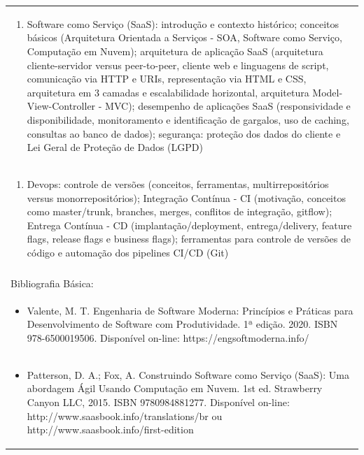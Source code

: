 \documentclass[11pt]{article}
\begin{document}
\begin{center}
\begin{longtable}{|p{4cm}|p{4cm}|p{4cm}|p{4cm}|}
\multicolumn{4}{|p{\dimexpr 16cm + 6\tabcolsep\relax}|}{\begin{enumerate}[start=4]\item Software como Serviço (SaaS): introdução e contexto histórico; conceitos básicos (Arquitetura Orientada a Serviços - SOA, Software como Serviço, Computação em Nuvem); arquitetura de aplicação SaaS (arquitetura cliente-servidor versus peer-to-peer, cliente web e linguagens de script, comunicação via HTTP e URIs, representação via HTML e CSS, arquitetura em 3 camadas e escalabilidade horizontal, arquitetura Model-View-Controller - MVC); desempenho de aplicações SaaS (responsividade e disponibilidade, monitoramento e identificação de gargalos, uso de caching, consultas ao banco de dados); segurança: proteção dos dados do cliente e Lei Geral de Proteção de Dados (LGPD)\end{enumerate}}\\
\multicolumn{4}{|p{\dimexpr 16cm + 6\tabcolsep\relax}|}{\begin{enumerate}[start=5]\item Devops: controle de versões (conceitos, ferramentas, multirrepositórios versus monorrepositórios); Integração Contínua - CI (motivação, conceitos como master/trunk, branches, merges, conflitos de integração, gitflow); Entrega Contínua - CD (implantação/deployment, entrega/delivery, feature flags, release flags e business flags); ferramentas para controle de versões de código e automação dos pipelines CI/CD (Git)\end{enumerate}}\\
\multicolumn{4}{|p{\dimexpr 16cm + 6\tabcolsep\relax}|}{}\\
\hline
\multicolumn{4}{|p{16cm}|}{Bibliografia Básica:}\\*
\multicolumn{4}{|p{\dimexpr 16cm + 6\tabcolsep\relax}|}{\begin{itemize}\item Valente, M. T. Engenharia de Software Moderna: Princípios e Práticas para Desenvolvimento de Software com Produtividade. 1ª edição. 2020. ISBN 978-6500019506. Disponível on-line: https://engsoftmoderna.info/\end{itemize}}\\
\multicolumn{4}{|p{\dimexpr 16cm + 6\tabcolsep\relax}|}{\begin{itemize}\item Patterson, D. A.; Fox, A. Construindo Software como Serviço (SaaS): Uma abordagem Ágil Usando Computação em Nuvem. 1st ed. Strawberry Canyon LLC, 2015. ISBN 9780984881277. Disponível on-line: http://www.saasbook.info/translations/br ou http://www.saasbook.info/first-edition\end{itemize}}\\

\end{longtable}
\end{center}
\end{document}
